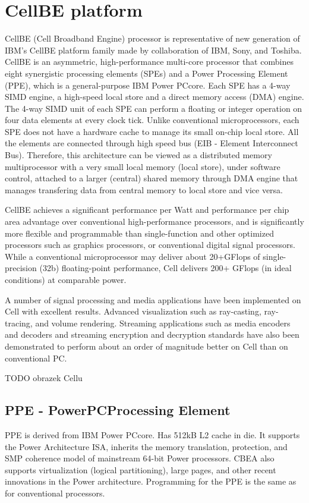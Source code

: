 \section{CellBE platform}

CellBE (Cell Broadband Engine) processor is representative of new generation of IBM's CellBE platform family made by collaboration of IBM, Sony, and Toshiba. CellBE is an asymmetric, high-performance multi-core processor that combines eight synergistic processing elements (SPEs) and a Power Processing Element (PPE), which is a general-purpose IBM Power PC\textregistered core. Each SPE has a 4-way SIMD engine, a high-speed local store and a direct memory access (DMA) engine. The 4-way SIMD unit of each SPE can perform a floating or integer operation on four data elements at every clock tick. Unlike conventional microprocessors, each SPE does not have a hardware cache to manage its small on-chip local store. All the elements are connected through high speed bus (EIB - Element Interconnect Bus). Therefore, this architecture can be viewed as a distributed memory multiprocessor with a very small local memory (local store), under software control, attached to a larger (central) shared memory through DMA engine that manages transfering data from central memory to local store and vice versa.

CellBE achieves a significant performance per Watt and performance per chip area advantage over conventional high-performance processors, and is significantly more flexible and programmable than single-function and other optimized processors such as graphics processors, or conventional digital signal processors. While a conventional microprocessor may deliver about 20+GFlops of single-precision (32b) floating-point performance, Cell delivers 200+ GFlops (in ideal conditions) at comparable power.

A number of signal processing and media applications have been implemented on Cell with excellent results. Advanced visualization such as ray-casting, ray-tracing, and volume rendering. Streaming applications such as media encoders and decoders and streaming encryption and decryption standards have also been demonstrated to perform about an order of magnitude better on Cell than on conventional PC.

TODO obrazek Cellu

\subsection{PPE - PowerPC\textregistered Processing Element}
PPE is derived from IBM Power PC\textregistered core. Has 512kB L2 cache in die. It supports the Power Architecture ISA, inherits the memory translation, protection, and SMP coherence model of mainstream 64-bit Power processors. CBEA also supports virtualization (logical partitioning), large pages, and other recent innovations in the Power architecture. Programming for the PPE is the same as for conventional processors.

